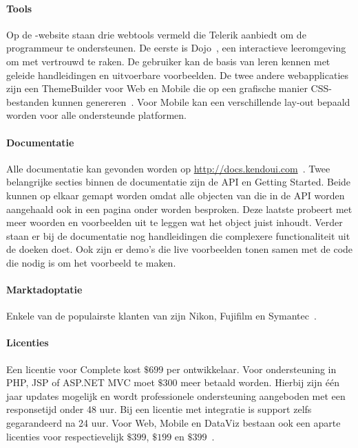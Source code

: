 \paragraph{Tools}
Op de \kendo{}-website staan drie webtools vermeld die Telerik aanbiedt om de programmeur te ondersteunen.
De eerste is \kendo{} Dojo~\cite{Telerika},  een interactieve leeromgeving om met \kendo{} vertrouwd te raken.
De gebruiker kan de basis van \kendo{} leren kennen met geleide handleidingen en uitvoerbare voorbeelden.
De twee andere webapplicaties zijn een ThemeBuilder voor Web en Mobile die op een grafische manier CSS-bestanden kunnen genereren~\cite{Telerikb,Telerikc}.
Voor \kendo{} Mobile kan een verschillende lay-out bepaald worden voor alle ondersteunde platformen.

\paragraph{Documentatie}
Alle documentatie kan gevonden worden op \url{http://docs.kendoui.com}~\cite{Telerikd}.
Twee belangrijke secties binnen de documentatie zijn de API en Getting Started.
Beide kunnen op elkaar gemapt worden omdat alle objecten van \kendo{} die in de API worden aangehaald ook in een pagina onder  worden besproken.
Deze laatste probeert met meer woorden en voorbeelden uit te leggen wat het object juist inhoudt.
Verder staan er bij de documentatie nog handleidingen die complexere functionaliteit uit de doeken doet.
Ook zijn er demo's die live voorbeelden tonen samen met de code die nodig is om het voorbeeld te maken.

\paragraph{Marktadoptatie}
Enkele van de populairste klanten van \kendo{} zijn Nikon,  Fujifilm en Symantec~\cite{Telerike}.

\paragraph{Licenties}
Een licentie voor \kendo{} Complete kost $\$699$ per ontwikkelaar.
Voor  ondersteuning in PHP,  JSP of ASP.NET MVC moet $\$300$ meer betaald worden.
Hierbij zijn één jaar updates mogelijk en wordt professionele ondersteuning aangeboden met een responsetijd onder 48 uur.
Bij een licentie met  integratie is support zelfs gegarandeerd na 24 uur.
Voor \kendo{} Web,  Mobile en DataViz bestaan ook een aparte licenties voor respectievelijk $\$399$,  $\$199$ en $\$399$~\cite{Telerik}.

